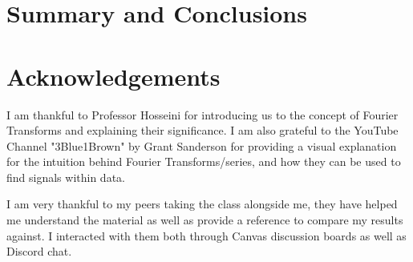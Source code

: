 \documentclass[11pt]{amsart}
\begin{document}


\section{Summary and Conclusions}\label{sec:conclusions}


\section*{Acknowledgements}

I am thankful to Professor Hosseini for introducing us to the concept of Fourier Transforms and explaining
their significance. I am also grateful to the YouTube Channel "3Blue1Brown" by Grant Sanderson for providing
a visual explanation for the intuition behind Fourier Transforms/series, and how they can be used to find 
signals within data. 

I am very thankful to my peers taking the class alongside me, they have helped me understand the material as well
as provide a reference to compare my results against. I interacted with them both through Canvas discussion boards
as well as Discord chat. 



\end{document}

